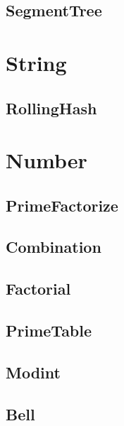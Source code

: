 \documentclass[titlepage, landscape, a4paper, twocolumn, 10pt]{ujarticle}
\begin{document}
\subsection{SegmentTree}



\section{String}

\subsection{RollingHash}



\section{Number}

\subsection{PrimeFactorize}


\subsection{Combination}


\subsection{Factorial}


\subsection{PrimeTable}


\subsection{Modint}


\subsection{Bell}

\end{document}
